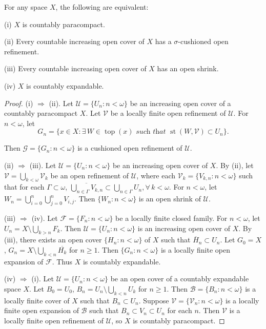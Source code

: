 \documentclass[ch3.tex]{subfiles}
\begin{document}
{\theorem{\label{th:3.3.2}}
For any space $X$, the following are equivalent:

\textup{(i)} $X$ is countably paracompact.

\textup{(ii)} Every countable increasing open cover of $X$ has a $\sigma$-cushioned open refinement.

\textup{(iii)} Every countable increasing open cover of $X$ has an open shrink.

\textup{(iv)} $X$ is countably expandable.
}


\begin{proof}
(i) $\Rightarrow$ (ii). Let $\mathscr{U} = \{U_n: n < \omega\}$ be an increasing 
open cover of a countably paracompact $X$. 
Let $\mathscr{V}$ be a locally finite  open refinement of $\mathscr{U}$. 
For $n < \omega$, let
$$G_n = \{x \in X: \exists \, W \in \operatorname{top}(x)  \textit{ such that }
\operatorname{st}(W, \mathscr{V}) \subset U_n\}.$$

\noindent Then $\mathscr{G} = \{G_n: n < \omega\}$ is a cushioned 
open refinement of $\mathscr{U}$.

(ii) $\Rightarrow$ (iii). Let $\mathscr{U} = \{U_n: n < \omega\}$ be 
an increasing open cover of $X$. By (ii), 
let $\mathscr{V} = \bigcup_{k < \omega} \mathscr{V}_k$ be an 
open refinement of $\mathscr{U}$, where each 
$\mathscr{V}_k = \{V_{k,n}: n < \omega\}$ such that for each 
$\Gamma \subset \omega$, 
$\overline{\bigcup_{n \in \Gamma} V_{k,n}} \subset \bigcup_{n \in \Gamma} U_n, \forall \, k < \omega$. For $n < \omega$, let $W_n = \bigcup_{i=0}^n \bigcup_{j=0}^n V_{i,j}$. 
Then $\{W_n: n < \omega\}$ is an open shrink of $\mathscr{U}$.

(iii) $\Rightarrow$ (iv). Let $\mathscr{F} = \{F_n: n < \omega\}$ be a locally finite closed family. For $n < \omega$, let
$U_n = X \setminus \bigcup_{k > n} F_k$.
Then $\mathscr{U} = \{U_n: n < \omega\}$ is an increasing open cover of $X$. 
By (iii), there exists an open cover $\{H_n: n < \omega\}$ of $X$ such that 
$\overline{H}_n \subset U_n$. Let $G_0 = X$, 
$G_n = X\setminus \bigcup_{k<n}\overline{H_k}$ for $n\ge 1$.
Then $\{G_n: n < \omega\}$ is a locally finite  open expansion of $\mathscr{F}$. 
Thus $X$ is countably expandable.

(iv) $\Rightarrow$ (i). Let $\mathscr{U} = \{U_n: n < \omega\}$ be an open cover 
of a countably expandable space $X$. Let $B_0 = U_0$, 
$B_n = U_n \setminus \bigcup_{k < n} U_k$ for $n \ge 1$.
 Then $\mathscr{B} = \{B_n: n < \omega\}$ is a locally finite cover of $X$ such that 
 $B_n \subset U_n$. Suppose $\mathscr{V}=\{\mathscr{V}_n: n < \omega\}$ 
 is a locally finite open expansion of $\mathscr{B}$ such that 
 $B_n \subset V_n \subset U_n$ for each $n$. 
 Then $\mathscr{V}$ is a locally finite open refinement of $\mathscr{U}$, 
 so $X$ is countably paracompact.
\end{proof}
\end{document}
